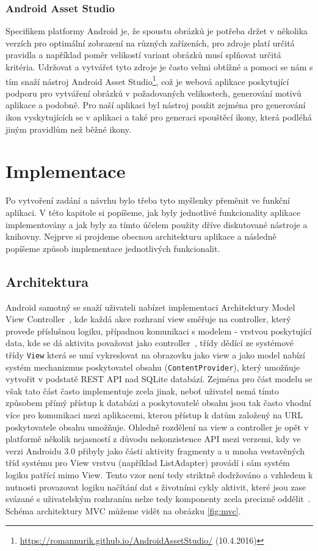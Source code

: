 \documentclass[czech,master,public,dept460,male,java,cpdeclaration]{diploma}
\begin{document}
 \subsubsection{Android Asset Studio}
 Specifikem platformy Android je, že spoustu obrázků je potřeba držet v několika verzích pro optimální
 zobrazení na různých zařízeních, pro zdroje platí určitá pravidla a například poměr velikostí variant
 obrázků musí splňovat určitá kritéria. Udržovat a vytvářet tyto zdroje je často velmi obtížné
 a pomoci se nám s tím snaží nástroj Android Asset Studio\footnote{\url{https://romannurik.github.io/AndroidAssetStudio/} (10.4.2016)}, což je webová aplikace poskytující
 podporu pro vytváření obrázků v požadovaných velikostech, generování motivů aplikace a podobně.
 Pro naší aplikaci byl nástroj použit zejména pro generování ikon vyskytujících se v aplikaci
 a také pro generaci spouštěcí ikony, která podléhá jiným pravidlům než běžné ikony.


\section{Implementace}
Po vytvoření zadání a návrhu bylo třeba tyto myšlenky přeměnit ve funkční aplikaci. V této kapitole si popíšeme,
jak byly jednotlivé funkcionality aplikace implementovány a jak byly za tímto účelem použity dříve diskutované nástroje a knihovny.
Nejprve si projdeme obecnou architekturu aplikace a následně popíšeme způsob implementace jednotlivých funkcionalit.

\subsection{Architektura}
Android samotný se snaží uživateli nabízet implementaci Architektury Model View Controller~\cite{bestpracticesfuturice}, kde
každá akce rozhraní view směřuje na controller, který provede příslušnou logiku, případnou komunikaci
s modelem - vrstvou poskytující data,
kde se dá aktivita považovat jako controller~\cite{mvcxmvp}, třídy dědící ze systémové třídy \texttt{View} která
se umí vykreslovat na obrazovku jako view a jako model nabízí systém mechanizmus poskytovatel obsahu
 (\texttt{ContentProvider}), který umožňuje vytvořit v podstatě REST API nad SQLite databází.
Zejména pro část modelu se však tato část často implementuje zcela jinak, neboť uživatel nemá tímto způsobem
přímý přístup k databázi a poskytovatelé obsahu jsou tak často vhodní více pro komunikaci mezi aplikacemi,
kterou přístup k datům založený na URL poskytovatele obsahu umožňuje. Ohledně rozdělení na view a controller je opět
v platformě několik nejasností z důvodu nekonzistence API mezi verzemi, kdy ve verzi Androidu 3.0 přibyly
jako části aktivity fragmenty a u mnoha vestavěných tříd systému pro View vrstvu (například ListAdapter)
provádí i sám systém logiku patřící mimo View. Tento vzor není tedy striktně dodržováno a vzhledem
k nutnosti provazovat logiku načítání dat s životními cykly aktivit, které jsou zase svázané s uživatelským
rozhraním nelze tedy komponenty zcela precizně oddělit~\cite{mvcxmvp}.
Schéma architektury MVC můžeme vidět na obrázku \ref{fig:mvc}.
\end{document}
